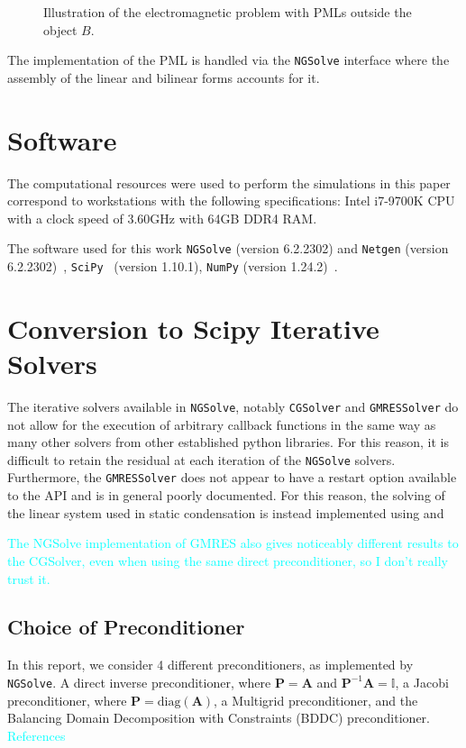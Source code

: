 \documentclass[a4paper,12]{elsarticle}
\theoremstyle{definition}
\begin{document}
\begin{figure}[htb]
\centering

\caption{Illustration of the electromagnetic problem with PMLs outside the object $B$.}
\end{figure}

The implementation of the PML is handled via the \texttt{NGSolve} interface where the assembly of the linear and bilinear forms accounts for it.

\section{Software}\label{sect:software}
The  computational resources were used to perform the simulations in this paper correspond to  workstations with the following specifications: Intel i7-9700K CPU with a clock speed of 3.60GHz with 64GB DDR4 RAM.

The software used for this work \texttt{NGSolve} (version 6.2.2302) and \texttt{Netgen} (version 6.2.2302)~\cite{NGSolve,zaglmayrphd,netgendet}, \texttt{SciPy}~\cite{2020SciPy-NMeth} (version 1.10.1), \texttt{NumPy} (version 1.24.2)~\cite{harris2020array}.

\section{Conversion to Scipy Iterative Solvers} \label{sect:scipy}
The iterative solvers available in \texttt{NGSolve}, notably \texttt{CGSolver} and \texttt{GMRESSolver} do not allow for the execution of arbitrary callback functions in the same way as many other solvers from other established python libraries. For this reason, it is difficult to retain the residual at each iteration of the \texttt{NGSolve} solvers. Furthermore, the \texttt{GMRESSolver} does not appear to have a restart option available to the API and is in general poorly documented. For this reason, the solving of the linear system used in static condensation is instead implemented using and 

\textcolor{cyan}{The NGSolve implementation of GMRES also gives noticeably different results to the CGSolver, even when using the same direct preconditioner, so I don't really trust it.}


%

%
\subsection{Choice of Preconditioner}
In this report, we consider 4 different preconditioners, as implemented by \texttt{NGSolve}. A direct inverse preconditioner, where $\mathbf{P} = \mathbf{A}$ and $\mathbf{P}^{-1}\mathbf{A} = \mathbb{I}$, a Jacobi preconditioner, where $\mathbf{P} = \mathrm{diag}(\mathbf{A})$, a Multigrid preconditioner, and the Balancing Domain Decomposition with Constraints (BDDC) preconditioner. \textcolor{cyan}{References}
\end{document}
